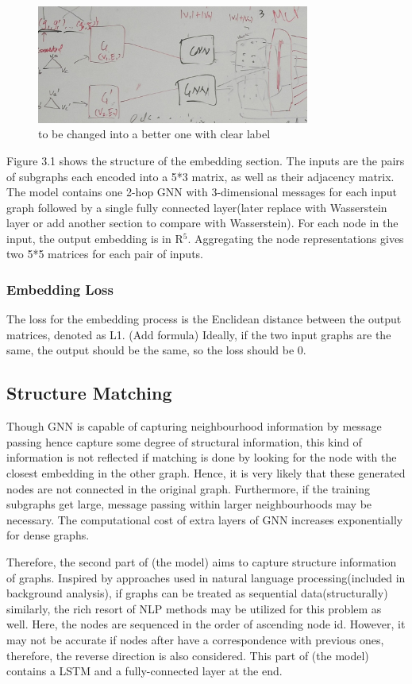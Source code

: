 \begin{figure}[H]
  \centering
  \includegraphics[width=0.80\textwidth]{embedding.jpg}
  \caption{to be changed into a better one with clear label}
\end{figure}

Figure 3.1 shows the structure of the embedding section. The inputs are the pairs of subgraphs each encoded into a 5*3 matrix, as well as their adjacency matrix. The model contains one 2-hop GNN with 3-dimensional messages for each input graph followed by a single fully connected layer(later replace with Wasserstein layer or add another section to compare with Wasserstein). For each node in the input, the output embedding is in R$^{5}$. Aggregating the node representations gives two 5*5 matrices for each pair of inputs.

\subsubsection{Embedding Loss}
The loss for the embedding process is the Enclidean distance between the output matrices, denoted as L1. (Add formula) Ideally, if the two input graphs are the same, the output should be the same, so the loss should be 0. 

\subsection{Structure Matching}
Though GNN is capable of capturing neighbourhood information by message passing hence capture some degree of structural information, this kind of information is not reflected if matching is done by looking for the node with the closest embedding in the other graph. Hence, it is very likely that these generated nodes are not connected in the original graph. Furthermore, if the training subgraphs get large, message passing within larger neighbourhoods may be necessary. The computational cost of extra layers of GNN increases exponentially for dense graphs.

Therefore, the second part of (the model) aims to capture structure information of graphs. Inspired by approaches used in natural language processing(included in background analysis), if graphs can be treated as sequential data(structurally) similarly, the rich resort of NLP methods may be utilized for this problem as well. Here, the nodes are sequenced in the order of ascending node id. However, it may not be accurate if nodes after have a correspondence with previous ones, therefore, the reverse direction is also considered. This part of (the model) contains a LSTM and a fully-connected layer at the end.

